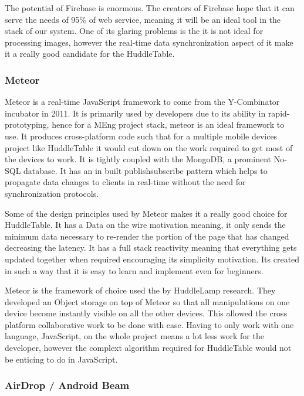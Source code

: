 The potential of Firebase is enormous. The creators of Firebase hope
that it can serve the needs of 95\% of web service\cite{firebase-wired},
meaning it will be an ideal tool in the stack of our system. One of
its glaring problems is the it is not ideal for processing images,
however the real-time data synchronization aspect of it make it a
really good candidate for the HuddleTable.


\subsubsection{Meteor}

Meteor\cite{meteor} is a real-time JavaScript framework to come from
the Y-Combinator incubator in 2011. It is primarily used by developers
due to its ability in rapid-prototyping, hence for a MEng project
stack, meteor is an ideal framework to use. It produces cross-platform
code such that for a multiple mobile devices project like HuddleTable
it would cut down on the work required to get most of the devices
to work. It is tightly coupled with the MongoDB, a prominent No-SQL
database. It has an in built publish\textendash subscribe pattern\cite{pub-sub-pattern}
which helps to propagate data changes to clients in real-time without
the need for synchronization protocols.

Some of the design principles used by Meteor makes it a really good
choice for HuddleTable. It has a Data on the wire motivation meaning,
it only sends the minimum data necessary to re-render the portion
of the page that has changed decreasing the latency. It has a full
stack reactivity\cite{meteor-wiki} meaning that everything gets updated
together when required encouraging its simplicity motivation. Its
created in such a way that it is easy to learn and implement even
for beginners. 

Meteor is the framework of choice used the by HuddleLamp research.
They developed an Object storage on top of Meteor so that all manipulations
on one device become instantly visible on all the other devices. This
allowed the cross platform collaborative work to be done with ease.
Having to only work with one language, JavaScript, on the whole project
means a lot less work for the developer, however the complext algorithm
required for HuddleTable would not be enticing to do in JavaScript.


\subsubsection{AirDrop / Android Beam}

